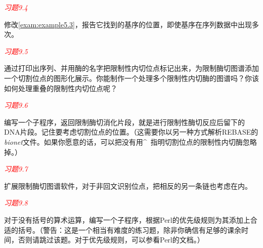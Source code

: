 \textcolor{red}{\textit{习题9.4}}
\begin{adjustwidth}{1cm}{}
修改\autoref{exam:example5.3}，报告它找到的基序的位置，即使基序在序列数据中出现多次。
\end{adjustwidth}

\textcolor{red}{\textit{习题9.5}}
\begin{adjustwidth}{1cm}{}
通过打印出序列、并用酶的名字把限制性内切位点标记出来，为限制酶切图谱添加一个切割位点的图形化展示。你能制作一个处理多个限制性内切酶的图谱吗？你该如何处理重叠的限制性内切位点呢？
\end{adjustwidth}

\textcolor{red}{\textit{习题9.6}}
\begin{adjustwidth}{1cm}{}
编写一个子程序，返回限制酶切消化片段，就是进行限制性酶切反应后留下的DNA片段。记住要考虑切割位点的位置。（这需要你以另一种方式解析REBASE的\textit{bionet}文件。如果你愿意的话，可以把没有用\^~指明切割位点的限制性内切酶忽略掉。）
\end{adjustwidth}


\textcolor{red}{\textit{习题9.7}}
\begin{adjustwidth}{1cm}{}
扩展限制酶切图谱软件，对于非回文识别位点，把相反的另一条链也考虑在内。
\end{adjustwidth}

\textcolor{red}{\textit{习题9.8}}
\begin{adjustwidth}{1cm}{}
对于没有括号的算术运算，编写一个子程序，根据Perl的优先级规则为其添加上合适的括号。（警告：这是一个相当有难度的练习题，除非你确信有足够的课余时间，否则请跳过该题。对于优先级规则，可以参看Perl的文档。）
\end{adjustwidth}


